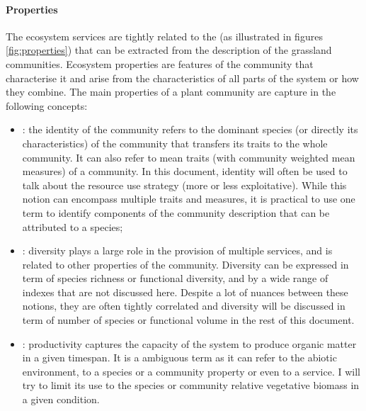 \paragraph{Properties}
The ecosystem services are tightly related to the  (as illustrated in figures \ref{fig:properties})\parencite{lavorel_predicting_2002, diaz_incorporating_2007} that can be extracted from the description of the grassland communities. Ecosystem properties are features of the community that characterise it and arise from the characteristics of all parts of  the system or how they combine. The main properties of a plant community are capture in the following concepts:
\begin{itemize}
\item {}: the identity of the community refers to the dominant species (or directly its characteristics) of the community that transfers its traits to the whole community. It can also refer to mean traits (with community weighted mean measures) of a community. In this document, identity will often be used to talk about the resource use strategy (more or less exploitative). While this notion can encompass multiple traits and measures, it is practical to use one term to identify components of the community description that can be attributed to a species;
\item {}: diversity plays a large role in the provision of multiple services, and is related to other properties of the community. Diversity can be expressed in term of species richness or functional diversity, and by a wide range of indexes that are not discussed here. Despite a lot of nuances between these notions, they are often tightly correlated and diversity will be discussed in term of number of species or functional volume in the rest of this document.
\item {}: productivity captures the capacity of the system to produce organic matter in a given timespan. It is a ambiguous term as it can refer to the abiotic environment, to a species or a community property or even to a service. I will try to limit its use to the species or community relative vegetative biomass in a given condition.
\end{itemize}


